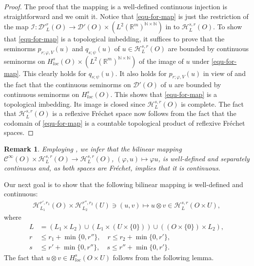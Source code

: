 \documentclass{amsart}
\newtheorem{remark}{Remark}[section]
\theoremstyle{definition}
\begin{document}
\begin{proof}
The proof that the mapping is a well-defined continuous injection is straightforward and we omit it. Notice that \eqref{equ-for-map} is just the restriction of the map $\mathcal{I}:\mathcal{D}'^r_L(O)\rightarrow \mathcal{D}'(O)\times (L^2(\mathbb{R}^m)^{\mathbb{N}\times \mathbb{N}})$ in \cite[Proposition 3.7]{PP} to $\mathscr{H}^{s,r}_L(O)$. To show that \eqref{equ-for-map} is a topological imbedding, it suffices to prove that the seminorms $p_{r;\varphi,V}(u)$ and $q_{s;\psi}(u)$ of $u\in\mathscr{H}^{s,r}_L(O)$ are bounded by continuous seminorms on $H^s_{loc}(O)\times (L^2(\mathbb{R}^m)^{\mathbb{N}\times \mathbb{N}})$ of the image of $u$ under \eqref{equ-for-map}. This clearly holds for $q_{s;\psi}(u)$. It also holds for $p_{r;\varphi,V}(u)$ in view of \cite[Proposition 3.7]{PP} and the fact that the continuous seminorms on $\mathcal{D}'(O)$ of $u$ are bounded by continuous seminorms on $H^s_{loc}(O)$. This shows that \eqref{equ-for-map} is a topological imbedding. Its image is closed since $\mathscr{H}^{s,r}_L(O)$ is complete. The fact that $\mathscr{H}^{s,r}_L(O)$ is a reflexive Fr\'echet space now follows from the fact that the codomain of \eqref{equ-for-map} is a countable topological product of reflexive Fr\'echet spaces.
\end{proof}

\begin{remark}
Employing \cite[Remark 3.9]{PP}, we infer that the bilinear mapping $\mathcal{C}^{\infty}(O)\times \mathscr{H}^{s,r}_L(O)\rightarrow \mathscr{H}^{s,r}_L(O)$, $(\varphi ,u)\mapsto \varphi u$, is well-defined and separately continuous and, as both spaces are Fr\'echet, \cite[Theorem 1, p. 158]{Kete2} implies that it is continuous.
\end{remark}


Our next goal is to show that the following bilinear mapping is well-defined and continuous:
\begin{align}
\label{preslikavanje}
\mathscr{H}_{L_1} ^{r',r_1} (O) \times \mathscr{H}_{L_2} ^{r'',r_2} (U) \ni (u,v) \mapsto u\otimes v \in \mathscr{H}_{L} ^{s,r} (O\times U),
\end{align}
where
\begin{align}
\label{Uslovi_na_indeks1}
L &= (L_1 \times L_2) \cup (L_1 \times (U\times \{0\})) \cup ((O\times \{0\})\times L_2),\\
\label{Uslovi_na_indeks2}
r &\leq r_1 + \min \{0,r''\}, \quad r \leq r_2 + \min \{0,r'\},\\
\label{Uslovi_na_indeks3}
s &\leq r' + \min \{0,r'' \}, \quad s \leq r'' + \min \{0,r' \}.
\end{align}
The fact that $u\otimes v \in H_{loc} ^s (O\times U)$ follows from the following lemma.
\end{document}
